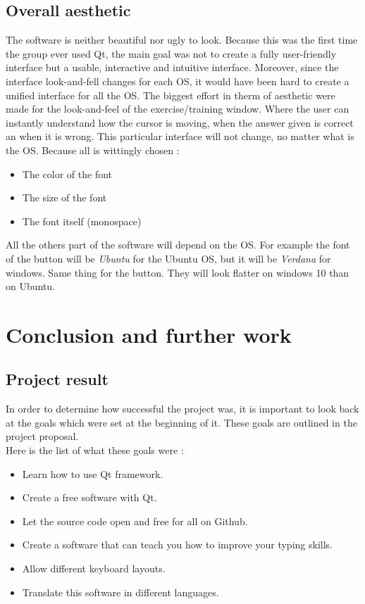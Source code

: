 \chapter{Overall aesthetic}
The software is neither beautiful nor ugly to look. Because this was the first time the group ever used Qt, the main goal was not to create a fully user-friendly interface but a usable, interactive and intuitive interface. Moreover, since the interface look-and-fell changes for each OS, it would have been hard to create a unified interface for all the OS. The biggest effort in therm of aesthetic were made for the look-and-feel of the exercise/training window. Where the user can instantly understand how the cursor is moving, when the answer given is correct an when it is wrong. This particular interface will not change, no matter what is the OS. Because all is wittingly chosen :
\begin{itemize}
	\item The color of the font
	\item The size of the font
	\item The font itself (monospace)
\end{itemize}
All the others part of the software will depend on the OS. For example the font of the button will be \textit{Ubuntu} for the Ubuntu OS, but it will be \textit{Verdana} for windows. Same thing for the button. They will look flatter on windows 10 than on Ubuntu.


\part{Conclusion and further work}
\chapter{Project result}
In order to determine how successful the project was, it is important to look back at the goals which were set at the beginning of it. These goals are outlined in the project proposal.\\
Here is the list of what these goals were :

\begin{itemize}
	\item Learn how to use Qt framework.
	\item Create a free software with Qt.
	\item Let the source code open and free for all on Github.
	\item Create a software that can teach you how to improve your typing skills.
	\item Allow different keyboard layouts.
	\item Translate this software in different languages.
\end{itemize}

